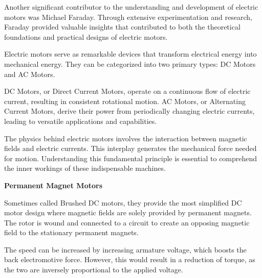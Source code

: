 \documentclass{article}
\begin{document}
\begin{flushleft}
Another significant contributor to the understanding and development of electric motors was Michael Faraday. Through extensive experimentation and research, Faraday provided valuable insights that contributed to both the theoretical foundations and practical designs of electric motors. \newline

Electric motors serve as remarkable devices that transform electrical energy into mechanical energy. They can be categorized into two primary types: DC Motors and AC Motors.\newline

DC Motors, or Direct Current Motors, operate on a continuous flow of electric current, resulting in consistent rotational motion. AC Motors, or Alternating Current Motors, derive their power from periodically changing electric currents, leading to versatile applications and capabilities. \newline

The physics behind electric motors involves the interaction between magnetic fields and electric currents. This interplay generates the mechanical force needed for motion. Understanding this fundamental principle is essential to comprehend the inner workings of these indispensable machines.\newline


\textbf{Permanent Magnet Motors} 

Sometimes called Brushed DC motors, they provide the most simplified DC motor design where magnetic fields are solely provided by permanent magnets. The rotor is wound and connected to a circuit to create an opposing magnetic field to the stationary permanent magnets.




The speed can be increased by increasing armature voltage, which boosts the back electromotive force. However, this would result in a reduction of torque, as the two are inversely proportional to the applied voltage.
\newline
\vspace*{3pt}


\end{flushleft}
\end{document}
